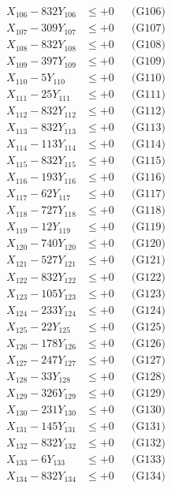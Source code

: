 \documentclass[a4paper,10pt]{article}
\begin{document}
{\begin{align}
X_{106} - 832Y_{106} &\leq +0 && \text{(G106)} \\
X_{107} - 309Y_{107} &\leq +0 && \text{(G107)} \\
X_{108} - 832Y_{108} &\leq +0 && \text{(G108)} \\
X_{109} - 397Y_{109} &\leq +0 && \text{(G109)} \\
X_{110} - 5Y_{110} &\leq +0 && \text{(G110)} \\
\allowbreak
X_{111} - 25Y_{111} &\leq +0 && \text{(G111)} \\
X_{112} - 832Y_{112} &\leq +0 && \text{(G112)} \\
X_{113} - 832Y_{113} &\leq +0 && \text{(G113)} \\
X_{114} - 113Y_{114} &\leq +0 && \text{(G114)} \\
X_{115} - 832Y_{115} &\leq +0 && \text{(G115)} \\
X_{116} - 193Y_{116} &\leq +0 && \text{(G116)} \\
X_{117} - 62Y_{117} &\leq +0 && \text{(G117)} \\
X_{118} - 727Y_{118} &\leq +0 && \text{(G118)} \\
X_{119} - 12Y_{119} &\leq +0 && \text{(G119)} \\
X_{120} - 740Y_{120} &\leq +0 && \text{(G120)} \\
\allowbreak
X_{121} - 527Y_{121} &\leq +0 && \text{(G121)} \\
X_{122} - 832Y_{122} &\leq +0 && \text{(G122)} \\
X_{123} - 105Y_{123} &\leq +0 && \text{(G123)} \\
X_{124} - 233Y_{124} &\leq +0 && \text{(G124)} \\
X_{125} - 22Y_{125} &\leq +0 && \text{(G125)} \\
X_{126} - 178Y_{126} &\leq +0 && \text{(G126)} \\
X_{127} - 247Y_{127} &\leq +0 && \text{(G127)} \\
X_{128} - 33Y_{128} &\leq +0 && \text{(G128)} \\
X_{129} - 326Y_{129} &\leq +0 && \text{(G129)} \\
X_{130} - 231Y_{130} &\leq +0 && \text{(G130)} \\
\allowbreak
X_{131} - 145Y_{131} &\leq +0 && \text{(G131)} \\
X_{132} - 832Y_{132} &\leq +0 && \text{(G132)} \\
X_{133} - 6Y_{133} &\leq +0 && \text{(G133)} \\
X_{134} - 832Y_{134} &\leq +0 && \text{(G134)} \\

\end{align}}
\end{document}

